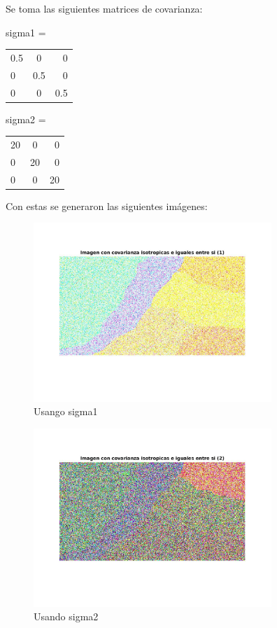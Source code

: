 \documentclass[a4paper,10pt]{article}
\begin{document}
Se toma las siguientes matrices de covarianza:

sigma1 = 
\begin{tabular}{ l c r }
  0.5 & 0 & 0 \\
  0 & 0.5 & 0 \\
  0 & 0 & 0.5 \\
\end{tabular}


sigma2 =
\begin{tabular}{ l c r }
  20 & 0 & 0 \\
  0 & 20 & 0 \\
  0 & 0 & 20 \\
\end{tabular}


Con estas se generaron las siguientes im\'agenes:

\begin{figure}[H]
\centering
\includegraphics[width=90mm]{imagenII1.jpg}
\caption{Usango sigma1}
\end{figure}


\begin{figure}[H]
\centering
\includegraphics[width=90mm]{imagenII2.jpg}
\caption{Usando sigma2}
\end{figure}
\end{document}
